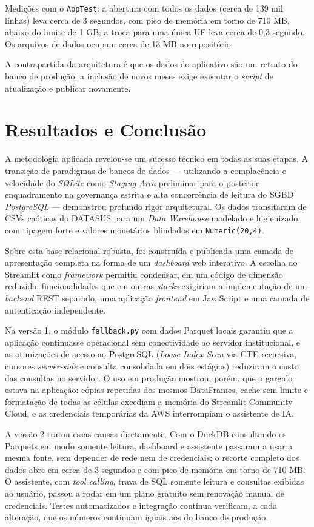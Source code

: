 \documentclass[12pt,a4paper]{report}
\begin{document}
Medições com o \texttt{AppTest}: a abertura com todos os dados (cerca de 139 mil linhas)
leva cerca de 3 segundos, com pico de memória em torno de 710 MB, abaixo do limite de
1 GB; a troca para uma única UF leva cerca de 0,3 segundo. Os arquivos de dados ocupam
cerca de 13 MB no repositório.

A contrapartida da arquitetura é que os dados do aplicativo são um retrato do banco de
produção: a inclusão de novos meses exige executar o \textit{script} de atualização e
publicar novamente.

\chapter{Resultados e Conclusão}

A metodologia aplicada revelou-se um sucesso técnico em todas as suas etapas.
A transição de paradigmas de bancos de dados — utilizando a complacência e velocidade
do \textit{SQLite} como \textit{Staging Area} preliminar para o posterior enquadramento
na governança estrita e alta concorrência de leitura do SGBD \textit{PostgreSQL} —
demonstrou profundo rigor arquitetural. Os dados transitaram de CSVs caóticos do
DATASUS para um \textit{Data Warehouse} modelado e higienizado, com tipagem forte e
valores monetários blindados em \texttt{Numeric(20,4)}.

Sobre esta base relacional robusta, foi construída e publicada uma camada de
apresentação completa na forma de um \textit{dashboard} web interativo. A escolha do
Streamlit como \textit{framework} permitiu condensar, em um código de dimensão reduzida,
funcionalidades que em outras \textit{stacks} exigiriam a implementação de um
\textit{backend} REST separado, uma aplicação \textit{frontend} em JavaScript e uma
camada de autenticação independente.

Na versão 1, o módulo \texttt{fallback.py} com dados Parquet locais garantiu que a
aplicação continuasse operacional sem conectividade ao servidor institucional, e as
otimizações de acesso ao PostgreSQL (\textit{Loose Index Scan} via CTE recursiva,
cursores \textit{server-side} e consulta consolidada em dois estágios) reduziram o custo
das consultas no servidor. O uso em produção mostrou, porém, que o gargalo estava na
aplicação: cópias repetidas dos mesmos DataFrames, cache sem limite e formatação de todas
as células excediam a memória do Streamlit Community Cloud, e as credenciais temporárias da
AWS interrompiam o assistente de IA.

A versão 2 tratou essas causas diretamente. Com o DuckDB consultando os Parquets em modo
somente leitura, dashboard e assistente passaram a usar a mesma fonte, sem depender de rede
nem de credenciais; o recorte completo dos dados abre em cerca de 3 segundos e com pico de
memória em torno de 710 MB. O assistente, com \textit{tool calling}, trava de SQL somente
leitura e consultas exibidas ao usuário, passou a rodar em um plano gratuito sem renovação
manual de credenciais. Testes automatizados e integração contínua verificam, a cada
alteração, que os números continuam iguais aos do banco de produção.
\end{document}
